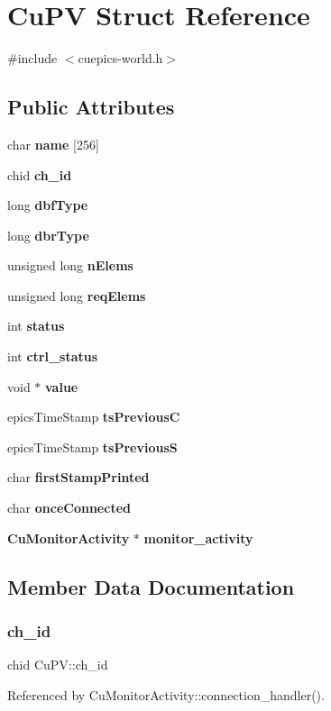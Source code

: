 \section{Cu\+PV Struct Reference}
\label{structCuPV}


{\ttfamily \#include $<$cuepics-\/world.\+h$>$}

\subsection*{Public Attributes}
\begin{DoxyCompactItemize}
\item 
char \textbf{ name} [256]
\item 
chid \textbf{ ch\+\_\+id}
\item 
long \textbf{ dbf\+Type}
\item 
long \textbf{ dbr\+Type}
\item 
unsigned long \textbf{ n\+Elems}
\item 
unsigned long \textbf{ req\+Elems}
\item 
int \textbf{ status}
\item 
int \textbf{ ctrl\+\_\+status}
\item 
void $\ast$ \textbf{ value}
\item 
epics\+Time\+Stamp \textbf{ ts\+PreviousC}
\item 
epics\+Time\+Stamp \textbf{ ts\+PreviousS}
\item 
char \textbf{ first\+Stamp\+Printed}
\item 
char \textbf{ once\+Connected}
\item 
\textbf{ Cu\+Monitor\+Activity} $\ast$ \textbf{ monitor\+\_\+activity}
\end{DoxyCompactItemize}


\subsection{Member Data Documentation}
\mbox{\label{structCuPV_a441cee12096b965d93ab99989a96b828}} 
\subsubsection{ch\+\_\+id}
{\footnotesize\ttfamily chid Cu\+P\+V\+::ch\+\_\+id}



Referenced by Cu\+Monitor\+Activity\+::connection\+\_\+handler().

